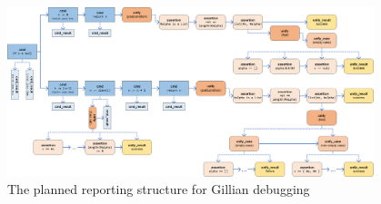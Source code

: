 
\begin{figure}
  \center{}
  \includegraphics[width=0.95\textwidth]{img/log-structure-desired.png}
  \caption{The planned reporting structure for Gillian debugging}\label{fig:log-structure-desired}
\end{figure}

\restoregeometry{}
